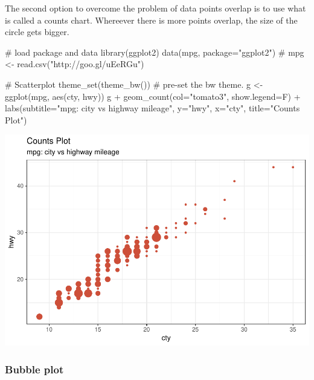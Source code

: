 \documentclass[a4paper]{article}
\newenvironment{Shaded}{}{}
\newcommand{\KeywordTok}[1]{\textcolor[rgb]{0.00,0.00,1.00}{#1}}
\newcommand{\DataTypeTok}[1]{#1}
\newcommand{\StringTok}[1]{\textcolor[rgb]{0.00,0.50,0.50}{#1}}
\newcommand{\CommentTok}[1]{\textcolor[rgb]{0.00,0.50,0.00}{#1}}
\newcommand{\OperatorTok}[1]{#1}
\newcommand{\NormalTok}[1]{#1}
\begin{document}
The second option to overcome the problem of data points overlap is to
use what is called a counts chart. Whereever there is more points
overlap, the size of the circle gets bigger.

\begin{Shaded}
\begin{Highlighting}[]
\CommentTok{# load package and data}
\KeywordTok{library}\NormalTok{(ggplot2)}
\KeywordTok{data}\NormalTok{(mpg, }\DataTypeTok{package=}\StringTok{"ggplot2"}\NormalTok{)}
\CommentTok{# mpg <- read.csv("http://goo.gl/uEeRGu")}

\CommentTok{# Scatterplot}
\KeywordTok{theme_set}\NormalTok{(}\KeywordTok{theme_bw}\NormalTok{())  }\CommentTok{# pre-set the bw theme.}
\NormalTok{g <-}\StringTok{ }\KeywordTok{ggplot}\NormalTok{(mpg, }\KeywordTok{aes}\NormalTok{(cty, hwy))}
\NormalTok{g }\OperatorTok{+}\StringTok{ }\KeywordTok{geom_count}\NormalTok{(}\DataTypeTok{col=}\StringTok{"tomato3"}\NormalTok{, }\DataTypeTok{show.legend=}\NormalTok{F) }\OperatorTok{+}
\StringTok{  }\KeywordTok{labs}\NormalTok{(}\DataTypeTok{subtitle=}\StringTok{"mpg: city vs highway mileage"}\NormalTok{, }
       \DataTypeTok{y=}\StringTok{"hwy"}\NormalTok{, }
       \DataTypeTok{x=}\StringTok{"cty"}\NormalTok{, }
       \DataTypeTok{title=}\StringTok{"Counts Plot"}\NormalTok{)}
\end{Highlighting}
\end{Shaded}

\includegraphics{M24-ggplot2_Gallery_files/figure-latex/unnamed-chunk-6-1.pdf}
\newpage

\subsubsection{Bubble plot}\label{bubble-plot}
\end{document}
